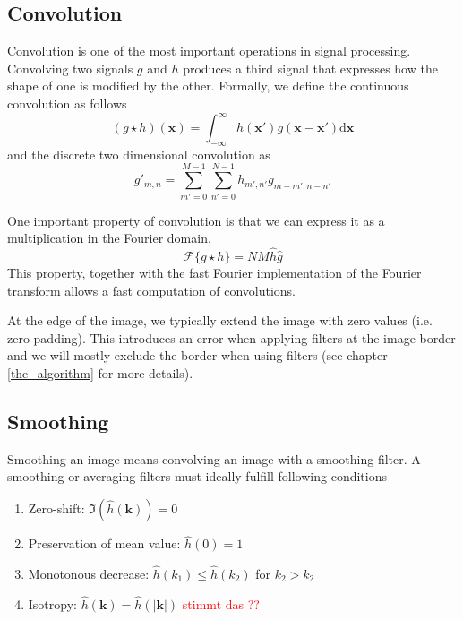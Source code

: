 		\subsection{Convolution}
		Convolution is one of the most important operations in signal processing. Convolving two signals $g$ and $h$ produces a third signal that expresses how the shape of one is modified by the other. Formally, we define the continuous convolution as follows
		\begin{equation}
			(g \star h)(\mathbf{x}) = \int_{-\infty}^{\infty} 
			h(\mathbf{x}') g(\mathbf{x} - \mathbf{x}')
			\text{d}\mathbf{x}
		\end{equation}
		and the discrete two dimensional convolution as
		\begin{equation}
			g'_{m,n} = \sum_{m'=0}^{M-1} \sum_{n'=0}^{N-1}
			h_{m',n'} g_{m-m', n-n'}
		\end{equation}
		
		One important property of convolution is that we can express it as a multiplication in the Fourier domain. 
		\begin{equation}
		\mathscr{F}\{g \star h\} = N M \hat{h} \hat{g}
		\end{equation}
		This property, together with the fast Fourier implementation of the Fourier transform allows a fast computation of convolutions. 
		
		At the edge of the image, we typically extend the image with zero values (i.e. zero padding). This introduces an error when applying filters at the image border and we will mostly exclude the border when using filters (see chapter \ref{the_algorithm} for more details).
		
		\subsection{Smoothing}
		Smoothing an image means convolving an image with a smoothing filter. A smoothing or averaging filters must ideally fulfill following conditions
		\begin{enumerate}
			\item Zero-shift: $\Im (\hat{h}(\mathbf{k})) = 0$
			\item Preservation of mean value: $\hat{h}(0) = 1 $
			\item Monotonous decrease: $ \hat{h}(k_1) \leq \hat{h}(k_2) $ for $ k_2 > k_2 $
			\item Isotropy: $\hat{h}(\mathbf{k}) = \hat{h}(| \mathbf{k} |)$ \textcolor{red}{stimmt das ??}
		\end{enumerate}
		
